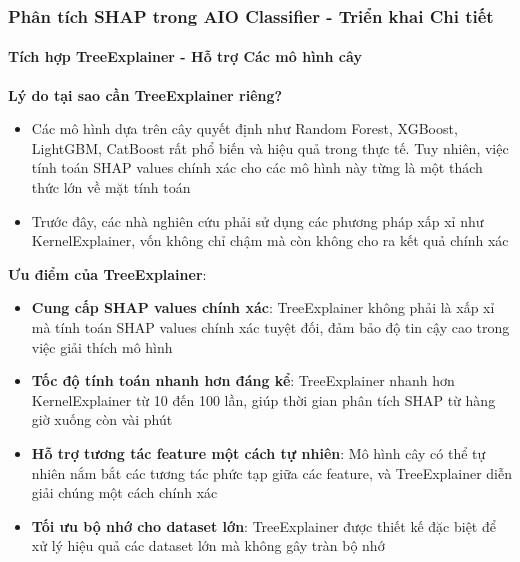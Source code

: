 \subsubsection{Phân tích SHAP trong AIO Classifier - Triển khai Chi tiết}

\paragraph{Tích hợp TreeExplainer - Hỗ trợ Các mô hình cây}

\textbf{Lý do tại sao cần TreeExplainer riêng?}
\begin{itemize}[leftmargin=*]
    \item Các mô hình dựa trên cây quyết định như Random Forest, XGBoost, LightGBM, CatBoost rất phổ biến và hiệu quả trong thực tế. Tuy nhiên, việc tính toán SHAP values chính xác cho các mô hình này từng là một thách thức lớn về mặt tính toán
    
    \item Trước đây, các nhà nghiên cứu phải sử dụng các phương pháp xấp xỉ như KernelExplainer, vốn không chỉ chậm mà còn không cho ra kết quả chính xác
\end{itemize}

\textbf{Ưu điểm của TreeExplainer}:
\begin{itemize}[leftmargin=*]
    \item \textbf{Cung cấp SHAP values chính xác}: TreeExplainer không phải là xấp xỉ mà tính toán SHAP values chính xác tuyệt đối, đảm bảo độ tin cậy cao trong việc giải thích mô hình
    
    \item \textbf{Tốc độ tính toán nhanh hơn đáng kể}: TreeExplainer nhanh hơn KernelExplainer từ 10 đến 100 lần, giúp thời gian phân tích SHAP từ hàng giờ xuống còn vài phút
    
    \item \textbf{Hỗ trợ tương tác feature một cách tự nhiên}: Mô hình cây có thể tự nhiên nắm bắt các tương tác phức tạp giữa các feature, và TreeExplainer diễn giải chúng một cách chính xác
    
    \item \textbf{Tối ưu bộ nhớ cho dataset lớn}: TreeExplainer được thiết kế đặc biệt để xử lý hiệu quả các dataset lớn mà không gây tràn bộ nhớ
\end{itemize}

